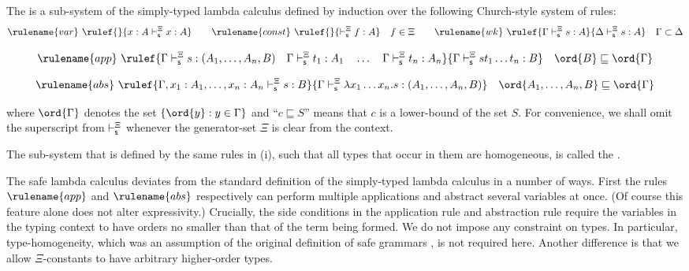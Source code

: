\begin{definition}\rm
\label{def:safelambda}
\begin{inparaenum}[(i)]
\item The  is a sub-system of the
  simply-typed lambda calculus defined by induction over the
  following Church-style system of rules:
$$ \rulename{var} \ \rulef{}{x : A\sentail^\Xi x : A} \qquad
\rulename{const} \ \rulef{}{\sentail^\Xi f : A}\quad f \in \Xi \qquad
\rulename{wk} \ \rulef{\Gamma \sentail^\Xi s : A}{\Delta \sentail^\Xi s : A}\quad
\Gamma \subset \Delta$$

$$ \rulename{app} \ \rulef{\Gamma \sentail^\Xi s : (A_1,\ldots,A_n,B)
\quad
  \Gamma \sentail^\Xi t_1 : A_1 \quad \ldots \quad \Gamma \sentail^\Xi t_n : A_n
} {\Gamma \sentail^\Xi s t_1 \ldots t_n : B} \quad \ord{B} \sqsubseteq
\ord{\Gamma}$$

$$ \rulename{abs} \ \rulef{\Gamma, x_1 : A_1, \ldots, x_n : A_n
  \sentail^\Xi s : B} {\Gamma \sentail^\Xi \lambda x_1 \ldots x_n . s :
  (A_1, \ldots ,A_n,B)} \quad \ord{A_1, \ldots ,A_n,B} \sqsubseteq
\ord{\Gamma}$$
\smallskip

where $\ord{\Gamma}$ denotes the set $\{ \ord{y} : y \in \Gamma \}$
and ``$c \sqsubseteq S$'' means that $c$ is a lower-bound of the set
$S$. For convenience, we shall omit the superscript from $\vdash_{\sf s}^\Xi$
whenever the generator-set $\Xi$ is clear from the context.

\noindent \item The sub-system that is defined by the same rules in
(i), such that all types that occur in them are homogeneous, is called
the .
\end{inparaenum}
\end{definition}


The safe lambda calculus deviates from the standard definition of
the simply-typed lambda calculus in a number of ways. First the
rules $\rulename{app}$ and $\rulename{abs}$ respectively can perform
multiple applications and abstract several variables at once. (Of
course this feature alone does not alter expressivity.) Crucially,
the side conditions in the application rule and abstraction rule
require the variables in the typing context to have orders no
smaller than that of the term being formed.  We do not impose any
constraint on types. In particular, type-homogeneity, which was an
assumption of the original definition of safe grammars \cite{KNU02},
is not required here. Another difference is that we allow
$\Xi$-constants to have
arbitrary higher-order types.  %

